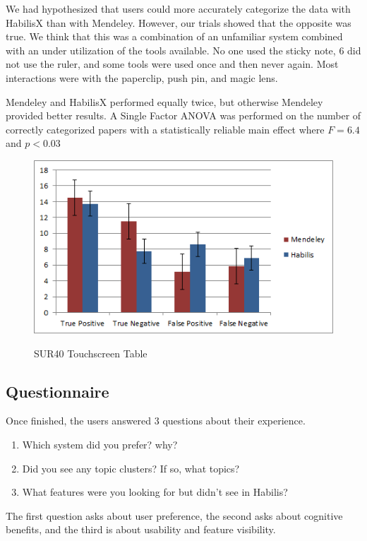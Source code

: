 \documentclass{article}
\begin{document}
We had hypothesized that users could more accurately categorize the data with HabilisX than with Mendeley.  However, our trials showed that the opposite was true.  We think that this was a combination of an unfamiliar system combined with an under utilization of the tools available.  No one used the sticky note, 6 did not use the ruler, and some tools were used once and then never again.  Most interactions were with the paperclip, push pin, and magic lens.    

Mendeley and HabilisX performed equally twice, but otherwise Mendeley provided better results.  A Single Factor ANOVA was performed on the number of correctly categorized papers with a statistically reliable main effect where $F=6.4$ and $p<0.03$

\begin{figure}[ht!]
\centering
\scalebox{1}
{\includegraphics{BarChartSquare.png}}
\caption{SUR40 Touchscreen Table}
\label{Fig:barChart}
\end{figure}



\subsection*{Questionnaire}
Once finished, the users answered 3 questions about their experience.  
	\begin{enumerate}
	\item Which system did you prefer? why?
	\item Did you see any topic clusters?  If so, what topics?
	\item What features were you looking for but didn't see in Habilis?
	\end{enumerate}

The first question asks about user preference, the second asks about cognitive benefits, and the third is  about usability and feature visibility.  
\end{document}
